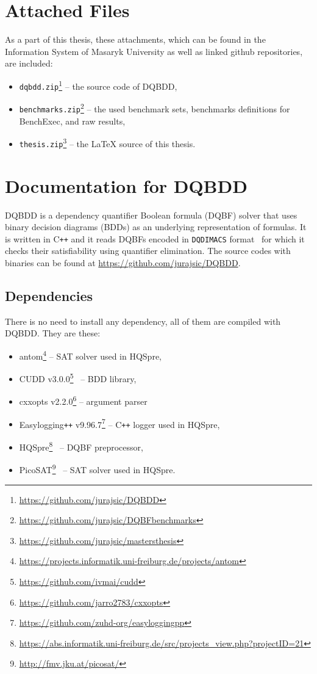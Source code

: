 \documentclass[
  digital, %
  color,
  twoside, %
  table,   %
  nolof,     %
  nolot,     %
]{fithesis3}
\theoremstyle{definition}
\theoremstyle{remark}
\newcommand{\DQDIMACS}[0]{\texttt{DQDIMACS}}
\newcommand{\Cplusplus}{C\texttt{++}}
\begin{document}
\begingroup
\setlength{\emergencystretch}{8em}
\printbibliography[heading=bibintoc]
\endgroup


\appendix %

\chapter{Attached Files}
\label{appendix:attachments}
As a part of this thesis, these attachments, which can be found in the Information System of Masaryk University as well as linked github repositories, are included:
\begin{itemize}
    \item \verb|dqbdd.zip|\footnote{\url{https://github.com/jurajsic/DQBDD}} -- the source code of DQBDD,
    \item \verb|benchmarks.zip|\footnote{\url{https://github.com/jurajsic/DQBFbenchmarks}} -- the used benchmark sets, benchmarks definitions for BenchExec, and raw results,
    \item \verb|thesis.zip|\footnote{\url{https://github.com/jurajsic/mastersthesis}} -- the \LaTeX{} source of this thesis.
\end{itemize}

\chapter{Documentation for DQBDD}
\label{appendix:DQBDD}
DQBDD is a dependency quantifier Boolean formula (DQBF) solver that uses binary decision diagrams (BDDs) as an underlying representation of formulas. It is written in \Cplusplus{} and it reads DQBFs encoded in \DQDIMACS{} format~\cite{iDQandDQDIMACS} for which it checks their satisfiability using quantifier elimination. The source codes with binaries can be found at \url{https://github.com/jurajsic/DQBDD}. 


\section{Dependencies}
There is no need to install any dependency, all of them are compiled with DQBDD. They are these:
\begin{itemize}
  \item antom\footnote{\url{https://projects.informatik.uni-freiburg.de/projects/antom}} -- SAT solver used in HQSpre,
  \item CUDD v3.0.0\footnote{\url{https://github.com/ivmai/cudd}}~\cite{CUDD} -- BDD library,
  \item cxxopts v2.2.0\footnote{\url{https://github.com/jarro2783/cxxopts}} -- argument parser
  \item Easylogging\texttt{++} v9.96.7\footnote{\url{https://github.com/zuhd-org/easyloggingpp}} -- \Cplusplus{} logger used in HQSpre,
  \item HQSpre\footnote{\url{https://abs.informatik.uni-freiburg.de/src/projects_view.php?projectID=21}}~\cite{HQSpreJournal} -- DQBF preprocessor,
  \item PicoSAT\footnote{\url{http://fmv.jku.at/picosat/}}~\cite{PicoSAT} -- SAT solver used in HQSpre.
\end{itemize}
\end{document}
